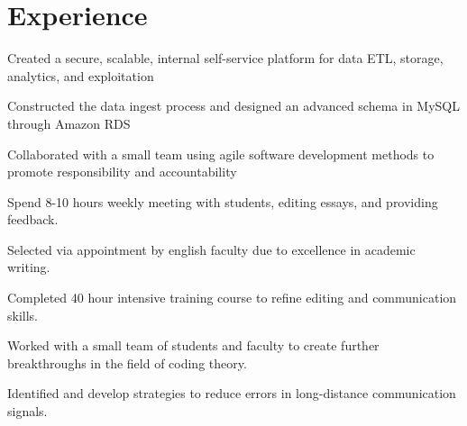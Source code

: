 \documentclass{resume}
\begin{document}
\hfill
\begin{minipage}[t]{0.66\textwidth}


\section{Experience}

\vspace{1.25\topsep} %
\begin{tightemize}
\item Created a secure, scalable, internal self-service platform for data ETL, storage, analytics, and exploitation
\item Constructed the data ingest process and designed an advanced schema in MySQL through Amazon RDS
\item Collaborated with a small team using agile software development methods to promote responsibility and accountability
\end{tightemize}
\sectionsep

\begin{tightemize}
\item Spend 8-10 hours weekly meeting with students, editing essays, and providing feedback. 
\item Selected via appointment by english faculty due to excellence in academic writing.
\item Completed 40 hour intensive training course to refine editing  and communication skills.
\end{tightemize}
\sectionsep

\begin{tightemize}
\item Worked with a small team of students and faculty to create further breakthroughs in the field of coding theory.
\item Identified and develop strategies to reduce errors in long-distance communication signals.
\end{tightemize}
\sectionsep



\end{minipage}
\end{document}
